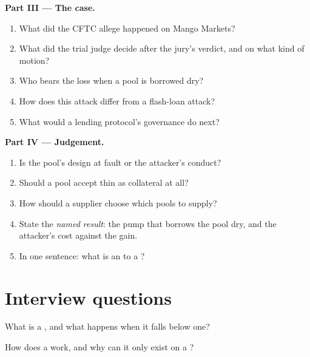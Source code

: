 \begin{problem}
\medskip\noindent\textbf{Part III --- The case.}
\begin{enumerate}[resume]
\item What did the CFTC allege happened on Mango Markets?
\item What did the trial judge decide after the jury's verdict, and on what kind of motion?
\item Who bears the loss when a pool is borrowed dry?
\item How does this attack differ from a flash-loan attack?
\item What would a lending protocol's governance do next?
\end{enumerate}

\medskip\noindent\textbf{Part IV --- Judgement.}
\begin{enumerate}[resume]
\item Is the pool's design at fault or the attacker's conduct?
\item Should a pool accept thin  as collateral at all?
\item How should a supplier choose which pools to supply?
\item State the \emph{named result}: the pump that borrows the pool dry, and the attacker's cost against the gain.
\item In one sentence: what is an  to a ?
\end{enumerate}
\end{problem}

\section{Interview questions}

\begin{interviewq}\label{iq:m3:defi-credit-and-leverage:1}
What is a , and what happens when it falls below one?
\end{interviewq}

\begin{interviewq}\label{iq:m3:defi-credit-and-leverage:2}
How does a  work, and why can it only exist on a ?
\end{interviewq}

